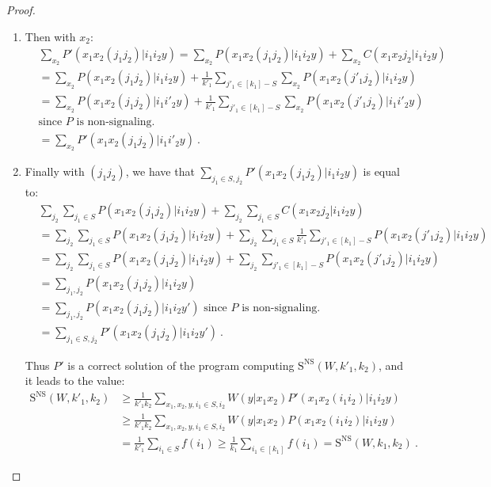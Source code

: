 \begin{proof}
\begin{enumerate}
\begin{enumerate}
    \item Then with $x_2$:
    \begin{equation}
      \begin{aligned}
      &\sum_{x_2} P'(x_1x_2(j_1j_2)|i_1i_2y) = \sum_{x_2} P(x_1x_2(j_1j_2)|i_1i_2y) + \sum_{x_2} C(x_1x_2j_2|i_1i_2y)\\
      &= \sum_{x_2} P(x_1x_2(j_1j_2)|i_1i_2y) + \frac{1}{k'_1}\sum_{j'_1 \in [k_1]-S}\sum_{x_2}P(x_1x_2(j'_1j_2)|i_1i_2y)\\
      &= \sum_{x_2} P(x_1x_2(j_1j_2)|i_1i'_2y) + \frac{1}{k'_1}\sum_{j'_1 \in [k_1]-S}\sum_{x_2}P(x_1x_2(j'_1j_2)|i_1i'_2y)\\
      &\text{since $P$ is non-signaling.}\\
      &= \sum_{x_2} P'(x_1x_2(j_1j_2)|i_1i'_2y) \ .
      \end{aligned}
    \end{equation}
    \item Finally with $(j_1j_2)$, we have that $\sum_{j_1 \in S,j_2} P'(x_1x_2(j_1j_2)|i_1i_2y)$ is equal to:
    \begin{equation}
      \begin{aligned}
      &\sum_{j_2}\sum_{j_1 \in S} P(x_1x_2(j_1j_2)|i_1i_2y) + \sum_{j_2}\sum_{j_1 \in S} C(x_1x_2j_2|i_1i_2y)\\
      &= \sum_{j_2}\sum_{j_1 \in S} P(x_1x_2(j_1j_2)|i_1i_2y) + \sum_{j_2}\sum_{j_1 \in S}\frac{1}{k'_1}\sum_{j'_1 \in [k_1]-S}P(x_1x_2(j'_1j_2)|i_1i_2y)\\
      &= \sum_{j_2}\sum_{j_1 \in S} P(x_1x_2(j_1j_2)|i_1i_2y) + \sum_{j_2}\sum_{j'_1 \in [k_1]-S}P(x_1x_2(j'_1j_2)|i_1i_2y)\\
      &= \sum_{j_1,j_2} P(x_1x_2(j_1j_2)|i_1i_2y)\\
      &= \sum_{j_1,j_2} P(x_1x_2(j_1j_2)|i_1i_2y') \text{ since $P$ is non-signaling.}\\
      &= \sum_{j_1 \in S,j_2} P'(x_1x_2(j_1j_2)|i_1i_2y') \ .
      \end{aligned}
    \end{equation}

       Thus $P'$ is a correct solution of the program computing $\mathrm{S}^{\mathrm{NS}}(W,k'_1,k_2)$, and it leads to the value:
    \begin{equation}
      \begin{aligned}
         \mathrm{S}^{\mathrm{NS}}(W,k'_1,k_2) &\geq \frac{1}{k'_1k_2} \sum_{x_1,x_2,y,i_1 \in S,i_2} W(y|x_1x_2)P'(x_1x_2(i_1i_2)|i_1i_2y)\\
         &\geq \frac{1}{k'_1k_2} \sum_{x_1,x_2,y,i_1 \in S,i_2} W(y|x_1x_2)P(x_1x_2(i_1i_2)|i_1i_2y)\\
         &= \frac{1}{k'_1} \sum_{i_1 \in S} f(i_1) \geq \frac{1}{k_1} \sum_{i_1 \in [k_1]} f(i_1) = \mathrm{S}^{\mathrm{NS}}(W,k_1,k_2) \ .
      \end{aligned}
    \end{equation}
    \end{enumerate}


\end{enumerate}
\end{proof}
